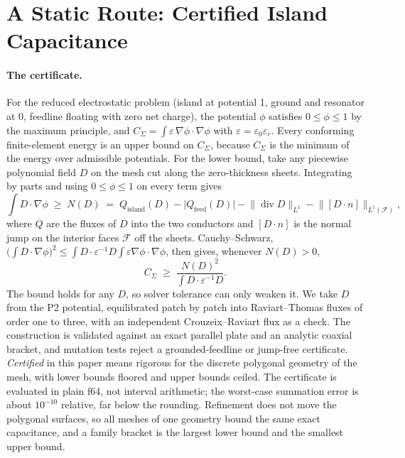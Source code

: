 \documentclass{anvil-paper}
\begin{document}
\section{A Static Route: Certified Island Capacitance}
\label{sec:static}

\paragraph{The certificate.}
For the reduced electrostatic problem (island at potential 1, ground and
resonator at 0, feedline floating with zero net charge), the potential
$\phi$ satisfies $0 \le \phi \le 1$ by the maximum principle, and
$C_\Sigma = \int \varepsilon\,\nabla\phi\cdot\nabla\phi$ with $\varepsilon
= \varepsilon_0\varepsilon_r$. Every conforming finite-element energy is an
upper bound on $C_\Sigma$, because $C_\Sigma$ is the minimum of the energy
over admissible potentials. For the lower bound, take any piecewise
polynomial field $D$ on the mesh cut along the zero-thickness sheets.
Integrating by parts and using $0\le\phi\le1$ on every term gives
\begin{equation}
  \int D\cdot\nabla\phi \;\ge\; N(D) \;=\; Q_{\mathrm{island}}(D)
  - \lvert Q_{\mathrm{feed}}(D)\rvert
  - \lVert \operatorname{div} D\rVert_{L^1}
  - \lVert [D\cdot n]\rVert_{L^1(\mathcal F)},
  \label{eq:cert-n}
\end{equation}
where $Q$ are the fluxes of $D$ into the two conductors and
$[D\cdot n]$ is the normal jump on the interior faces $\mathcal F$ off
the sheets. Cauchy--Schwarz, $\bigl(\int D\cdot\nabla\phi\bigr)^2 \le
\int D\cdot\varepsilon^{-1}D \int\varepsilon\nabla\phi\cdot\nabla\phi$,
then gives, whenever $N(D) > 0$,
\begin{equation}
  C_\Sigma \;\ge\; \frac{N(D)^2}{\int D\cdot\varepsilon^{-1}D}.
  \label{eq:cert}
\end{equation}
The bound holds for any $D$, so solver tolerance can only weaken it. We
take $D$ from the P2 potential, equilibrated patch by patch into
Raviart--Thomas fluxes of order one to three, with an independent
Crouzeix--Raviart flux as a check. The construction is validated against
an exact parallel plate and an analytic coaxial bracket, and mutation tests
reject a grounded-feedline or jump-free certificate. \emph{Certified} in this paper means rigorous
for the discrete polygonal geometry of the mesh, with lower bounds
floored and upper bounds ceiled. The certificate is evaluated in plain
f64, not interval arithmetic; the worst-case summation error is about
$10^{-10}$ relative, far below the rounding. Refinement does not move the
polygonal surfaces, so all meshes of one geometry bound the same exact
capacitance, and a family bracket is the largest lower bound and the
smallest upper bound.
\end{document}
